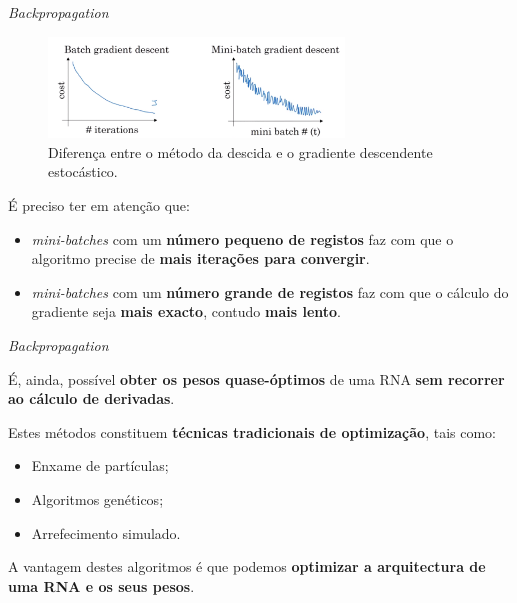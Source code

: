 \begin{frame}{\textit{Backpropagation} \cont}
    
    \begin{figure}
        \centering
        \includegraphics[width=0.7\textwidth]{img/grad_descent.png}
        \caption{Diferença entre o método da descida e o gradiente descendente estocástico.}
    \end{figure}
    
    \pauseskip
    
    É preciso ter em atenção que:
    \begin{itemize}
        \item \textit{mini-batches} com um \textbf{número pequeno de registos} faz com que o algoritmo precise de \textbf{mais iterações para convergir}.
        \medskip
        \item \textit{mini-batches} com um \textbf{número grande de registos} faz com que o cálculo do gradiente seja \textbf{mais exacto}, contudo \textbf{mais lento}.
    \end{itemize}
    
\end{frame}

\begin{frame}{\textit{Backpropagation} \cont}
    
    É, ainda, possível \textbf{obter os pesos quase-óptimos} de uma RNA \textbf{sem recorrer ao cálculo de derivadas}.
    
    \pauseskip
    
    Estes métodos constituem \textbf{técnicas tradicionais de optimização}, tais como:
    \begin{itemize}
        \item Enxame de partículas;
        \medskip
        \item Algoritmos genéticos;
        \medskip
        \item Arrefecimento simulado.
    \end{itemize}

    \pauseskip
    
    A vantagem destes algoritmos é que podemos \textbf{optimizar a arquitectura de uma RNA e os seus pesos}.
    
    
\end{frame}

